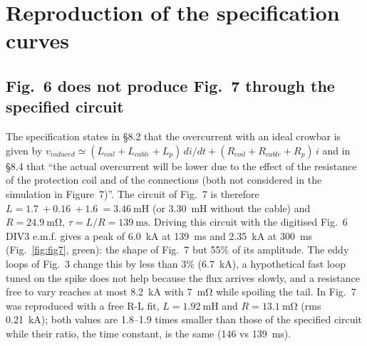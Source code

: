 \documentclass[11pt,a4paper]{article}
\begin{document}
\section{Reproduction of the specification curves}
\label{sec:repro}
\subsection{Fig.~6 does not produce Fig.~7 through the specified circuit}
\label{sec:fig7}
The specification states in \S8.2 that the overcurrent with an ideal crowbar is given by $v_{induced} \simeq (L_{coil}+L_{cable}+L_p)\,di/dt + (R_{coil}+R_{cable}+R_p)\,i$ and in \S8.4 that ``the actual overcurrent will be lower due to the effect of the resistance of the protection coil and of the connections (both not considered in the simulation in Figure~7)''. The circuit of Fig.~7 is therefore $L = \SI{1.7}{} + \SI{0.16}{} + \SI{1.6}{} = \SI{3.46}{\milli\henry}$ (or \SI{3.30}{\milli\henry} without the cable) and $R = \SI{24.9}{\milli\ohm}$, $\tau = L/R = \SI{139}{\milli\second}$. Driving this circuit with the digitised Fig.~6 DIV3 e.m.f. gives a peak of \SI{6.0}{\kilo\ampere} at \SI{139}{\milli\second} and \SI{2.35}{\kilo\ampere} at \SI{300}{\milli\second} (Fig.~\ref{fig:fig7}, green): the shape of Fig.~7 but 55\% of its amplitude. The eddy loops of Fig.~3 change this by less than 3\% (\SI{6.7}{\kilo\ampere}), a hypothetical fast loop tuned on the spike does not help because the flux arrives slowly, and a resistance free to vary reaches at most \SI{8.2}{\kilo\ampere} with \SI{7}{\milli\ohm} while spoiling the tail. In \cite{crowbar_note} Fig.~7 was reproduced with a free R-L fit, $L = \SI{1.92}{\milli\henry}$ and $R = \SI{13.1}{\milli\ohm}$ (rms \SI{0.21}{\kilo\ampere}); both values are \num{1.8}--\num{1.9} times smaller than those of the specified circuit while their ratio, the time constant, is the same (\SI{146}{} vs \SI{139}{\milli\second}).
\end{document}
